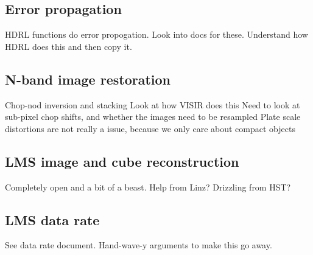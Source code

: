 \subsection{Error propagation}\label{ssec:criticalerrorpropagation}

HDRL functions do error propogation. Look into docs for these. 
Understand how HDRL does this and then copy it.

\subsection{N-band image restoration}\label{ssec:criticalnbandimagerestoration}

Chop-nod inversion and stacking
Look at how VISIR does this
Need to look at sub-pixel chop shifts, and whether the images need to be resampled
Plate scale distortions are not really a issue, because we only care about compact objects

\subsection{LMS image and cube reconstruction}\label{ssec:criticallmsimageandcubereconstruction}

Completely open and a bit of a beast. 
Help from Linz?
Drizzling from HST?

\subsection{LMS data rate}\label{ssec:criticallmsdatarate}

See data rate document. 
Hand-wave-y arguments to make this go away.


